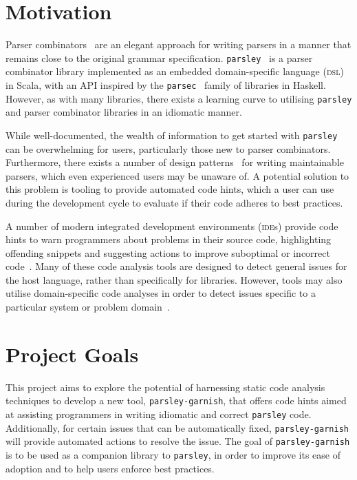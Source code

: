 \documentclass[../../main.tex]{subfiles}
\begin{document}

\section{Motivation}
Parser combinators~\cite{hutton_higher-order_1992} are an elegant approach for writing parsers in a manner that remains close to the original grammar specification.
\texttt{parsley}~\cite{willis_garnishing_2018} is a parser combinator library implemented as an embedded domain-specific language (\textsc{dsl})~\cite{hudak_building_1996} in Scala, with an API inspired by the \texttt{parsec}~\cite{leijen_parsec_2001} family of libraries in Haskell.
However, as with many libraries, there exists a learning curve to utilising \texttt{parsley} and parser combinator libraries in an idiomatic manner.

While well-documented, the wealth of information to get started with \texttt{parsley} can be overwhelming for users, particularly those new to parser combinators.
Furthermore, there exists a number of design patterns~\cite{willis_design_2022} for writing maintainable parsers, which even experienced users may be unaware of.
A potential solution to this problem is tooling to provide automated code hints, which a user can use during the development cycle to evaluate if their code adheres to best practices.


A number of modern integrated development environments (\textsc{ide}s) provide code hints to warn programmers about problems in their source code, highlighting offending snippets and suggesting actions to improve suboptimal or incorrect code~\cite{kurbatova_intellij_2021}.
Many of these code analysis tools are designed to detect general issues for the host language, rather than specifically for libraries.
However, tools may also utilise domain-specific code analyses in order to detect issues specific to a particular system or problem domain~\cite{renggli_domain-specific_2010,gregor_stllint_2006}.

\section{Project Goals}
This project aims to explore the potential of harnessing static code analysis techniques to develop a new tool, \texttt{parsley-garnish}, that offers code hints aimed at assisting programmers in writing idiomatic and correct \texttt{parsley} code.
Additionally, for certain issues that can be automatically fixed, \texttt{parsley-garnish} will provide automated actions to resolve the issue. %
The goal of \texttt{parsley-garnish} is to be used as a companion library to \texttt{parsley}, in order to improve its ease of adoption and to help users enforce best practices.
\end{document}
